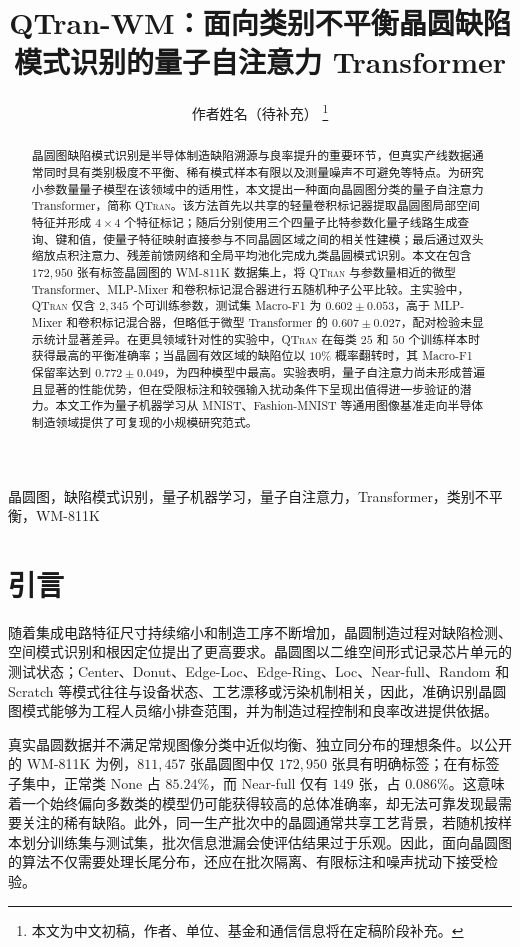 \documentclass[journal]{IEEEtran}
\title{QTran-WM：面向类别不平衡晶圆缺陷模式识别的量子自注意力 Transformer}
\author{作者姓名（待补充）%
\thanks{本文为中文初稿，作者、单位、基金和通信信息将在定稿阶段补充。}}
\newcommand{\qtran}{\textsc{QTran}}
\newcommand{\wm}{\textsc{WM-811K}}
\begin{document}
\maketitle

\begin{abstract}
晶圆图缺陷模式识别是半导体制造缺陷溯源与良率提升的重要环节，但真实产线数据通常同时具有类别极度不平衡、稀有模式样本有限以及测量噪声不可避免等特点。为研究小参数量量子模型在该领域中的适用性，本文提出一种面向晶圆图分类的量子自注意力 Transformer，简称 \qtran。该方法首先以共享的轻量卷积标记器提取晶圆图局部空间特征并形成 $4\times4$ 个特征标记；随后分别使用三个四量子比特参数化量子线路生成查询、键和值，使量子特征映射直接参与不同晶圆区域之间的相关性建模；最后通过双头缩放点积注意力、残差前馈网络和全局平均池化完成九类晶圆模式识别。本文在包含 $172{,}950$ 张有标签晶圆图的 \wm{} 数据集上，将 \qtran{} 与参数量相近的微型 Transformer、MLP-Mixer 和卷积标记混合器进行五随机种子公平比较。主实验中，\qtran{} 仅含 $2{,}345$ 个可训练参数，测试集 Macro-F1 为 $0.602\pm0.053$，高于 MLP-Mixer 和卷积标记混合器，但略低于微型 Transformer 的 $0.607\pm0.027$，配对检验未显示统计显著差异。在更具领域针对性的实验中，\qtran{} 在每类 $25$ 和 $50$ 个训练样本时获得最高的平衡准确率；当晶圆有效区域的缺陷位以 $10\%$ 概率翻转时，其 Macro-F1 保留率达到 $0.772\pm0.049$，为四种模型中最高。实验表明，量子自注意力尚未形成普遍且显著的性能优势，但在受限标注和较强输入扰动条件下呈现出值得进一步验证的潜力。本文工作为量子机器学习从 MNIST、Fashion-MNIST 等通用图像基准走向半导体制造领域提供了可复现的小规模研究范式。
\end{abstract}

\begin{IEEEkeywords}
晶圆图，缺陷模式识别，量子机器学习，量子自注意力，Transformer，类别不平衡，\wm
\end{IEEEkeywords}

\section{引言}

随着集成电路特征尺寸持续缩小和制造工序不断增加，晶圆制造过程对缺陷检测、空间模式识别和根因定位提出了更高要求。晶圆图以二维空间形式记录芯片单元的测试状态；Center、Donut、Edge-Loc、Edge-Ring、Loc、Near-full、Random 和 Scratch 等模式往往与设备状态、工艺漂移或污染机制相关，因此，准确识别晶圆图模式能够为工程人员缩小排查范围，并为制造过程控制和良率改进提供依据\cite{wu2015wafer}。

真实晶圆数据并不满足常规图像分类中近似均衡、独立同分布的理想条件。以公开的 \wm{} 为例，$811{,}457$ 张晶圆图中仅 $172{,}950$ 张具有明确标签；在有标签子集中，正常类 None 占 $85.24\%$，而 Near-full 仅有 $149$ 张，占 $0.086\%$。这意味着一个始终偏向多数类的模型仍可能获得较高的总体准确率，却无法可靠发现最需要关注的稀有缺陷。此外，同一生产批次中的晶圆通常共享工艺背景，若随机按样本划分训练集与测试集，批次信息泄漏会使评估结果过于乐观。因此，面向晶圆图的算法不仅需要处理长尾分布，还应在批次隔离、有限标注和噪声扰动下接受检验。
\end{document}
